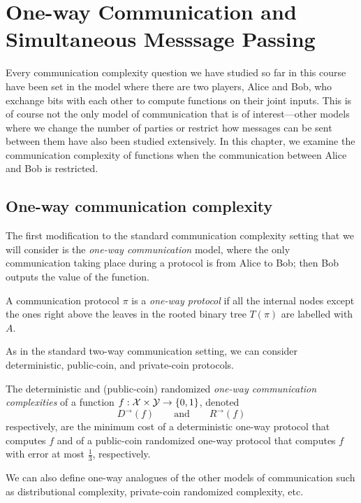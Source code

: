 \chapter[One-way Communication and SMP]{One-way Communication and Simultaneous Messsage Passing}
Every communication complexity question we have studied so far in this course have been set in the model where there are two players, Alice and Bob, who exchange bits with each other to compute functions on their joint inputs. This is of course not the only model of communication that is of interest---other models where we change the number of parties or restrict how messages can be sent between them have also been studied extensively. In this chapter, we examine the communication complexity of functions when the communication between Alice and Bob is restricted.



\newpage 
\section{One-way communication complexity}

The first modification to the standard communication complexity setting that we will consider is the \emph{one-way communication} model, where the only communication taking place during a protocol is from Alice to Bob; then Bob outputs the value of the function.

\begin{definition}
A communication protocol $\pi$ is a \emph{one-way protocol} if all the internal nodes except the ones right above the leaves in the rooted binary tree $T(\pi)$ are labelled with $A$.
\end{definition}

As in the standard two-way communication setting, we can consider deterministic, public-coin, and private-coin protocols.

\begin{definition}
The deterministic and (public-coin) randomized \emph{one-way communication complexities} of a function $f : \mathcal{X} \times \mathcal{Y} \to \{0,1\}$, denoted
\[
D^{\rightarrow}(f) \qquad \mbox{and} \qquad R^{\rightarrow}(f)
\]
respectively, are the minimum cost of a deterministic one-way protocol that computes $f$ and of a public-coin randomized one-way protocol that computes $f$ with error at most $\frac13$, respectively.
\end{definition}

\begin{remark}
We can also define one-way analogues of the other models of communication such as distributional complexity, private-coin randomized complexity, etc.
\end{remark}

